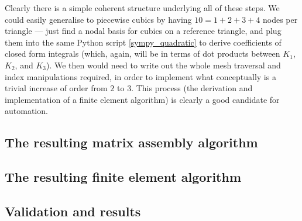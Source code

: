 Clearly there is a simple coherent structure underlying all of these steps. We could easily generalise to piecewise cubics
by having $10 = 1 + 2 + 3 + 4$ nodes per triangle --- just find a nodal basis for cubics on a reference triangle,
and plug them into the same Python script \ref{sympy_quadratic} to derive coefficients of closed form integrals (which, again,
will be in terms of dot products between $K_1$, $K_2$, and $K_3$). We then would need to write out the whole mesh traversal
and index manipulations required, in order to implement what conceptually is a trivial increase of order from $2$ to $3$.
This process (the derivation and implementation of a finite element algorithm) is clearly a good candidate for automation.

\subsection{The resulting matrix assembly algorithm}
\subsection{The resulting finite element algorithm}
\subsection{Validation and results}

